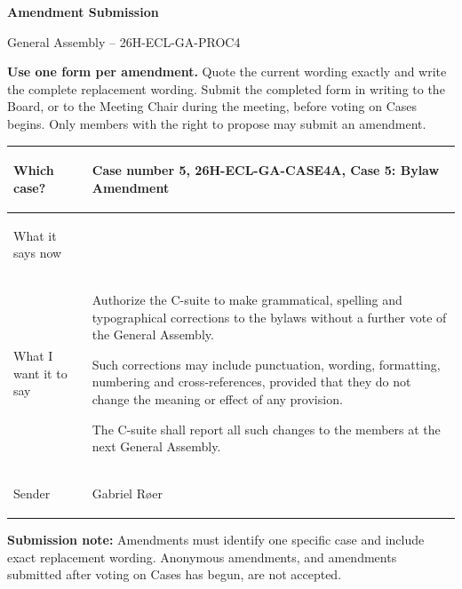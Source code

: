 \documentclass{../../Common/Latex/Templates/rapport}
\date{\meetingdate, \meetingtime}
\begin{document}
\reportmainmatter
\small
\setlength{\parindent}{0pt}
\setlength{\tabcolsep}{6pt}
\renewcommand{\arraystretch}{1.2}

\begin{center}
  {\Large\bfseries Amendment Submission}\par
  \vspace{0.15cm}
  {\normalsize General Assembly -- 26H-ECL-GA-PROC4}\par
  \vspace{0.1cm}
  {\small \meetingline}\par
\end{center}

\vspace{0.2cm}
\textbf{Use one form per amendment.} Quote the current wording exactly and write the complete replacement wording. Submit the completed form in writing to the Board, or to the Meeting Chair during the meeting, before voting on Cases begins. Only members with the right to propose may submit an amendment.

\vspace{0.4cm}
\begin{tabularx}{\textwidth}{|>{\bfseries\raggedright\arraybackslash}p{3.7cm}|X|}
  \hline
  Which case?
   & \rule{0pt}{1.2cm}Case number 5, 26H-ECL-GA-CASE4A, Case 5: Bylaw Amendment                                                                                  \\
  \hline
  What it says now
   & \rule{0pt}{1.2cm}                                                                                                                                           \\
  \hline
  What I want it to say
   & Authorize the C-suite to make grammatical, spelling and typographical corrections to the bylaws without a further vote of the General Assembly.\par\medskip
  Such corrections may include punctuation, wording, formatting, numbering and cross-references, provided that they do not change the meaning or effect of any provision.\par\medskip
  The C-suite shall report all such changes to the members at the next General Assembly.                                                                         \\
  \hline
  Sender
   & \rule{0pt}{1.2cm}Gabriel Røer                                                                                                                               \\
  \hline
\end{tabularx}

\vfill
\textbf{Submission note:} Amendments must identify one specific case and include exact replacement wording. Anonymous amendments, and amendments submitted after voting on Cases has begun, are not accepted.
\end{document}
